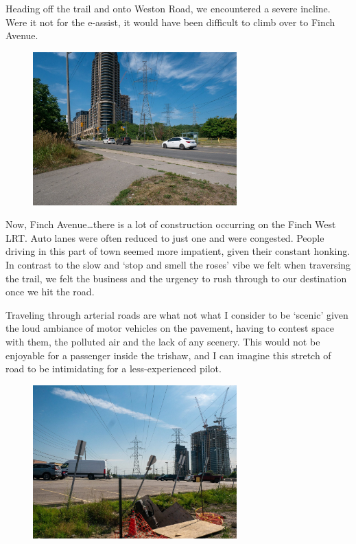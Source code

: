 \documentclass[letter]{ourGreenwayBrand}
\begin{document}
Heading off the trail and onto Weston Road, we encountered a severe incline. Were it not for the e-assist, it would have been difficult to climb over to Finch Avenue.

\begin{figure}[htbp]
  \centering
  \includegraphics[width=0.7\textwidth]{images/1220590-2048x1538.jpg}
\end{figure}

Now, Finch Avenue…there is a lot of construction occurring on the Finch West LRT. Auto lanes were often reduced to just one and were congested. People driving in this part of town seemed more impatient, given their constant honking. In contrast to the slow and ‘stop and smell the roses’ vibe we felt when traversing the trail, we felt the business and the urgency to rush through to our destination once we hit the road.

Traveling through arterial roads are what not what I consider to be ‘scenic’ given the loud ambiance of motor vehicles on the pavement, having to contest space with them, the polluted air and the lack of any scenery. This would not be enjoyable for a passenger inside the trishaw, and I can imagine this stretch of road to be intimidating for a less-experienced pilot.

\begin{figure}[htbp]
  \centering
  \includegraphics[width=0.7\textwidth]{images/1220594-2048x1538.jpg}
\end{figure}
\end{document}
